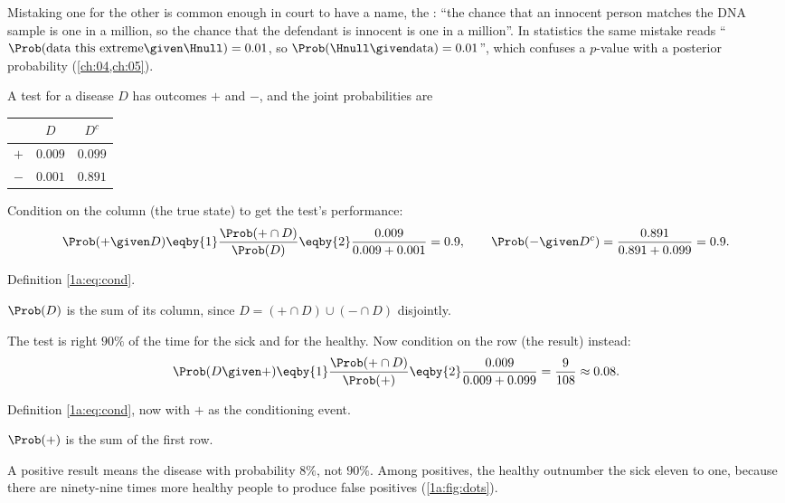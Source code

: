 Mistaking one for the other is
common enough in court to have a name, the :
``the chance that an innocent person matches the DNA sample is one in a
million, so the chance that the defendant is innocent is one in a million''.
In statistics the same mistake reads ``$\Prob(\text{data this extreme}\given\Hnull)=0.01$,
so $\Prob(\Hnull\given\text{data})=0.01$'', which confuses a $p$-value with a
posterior probability (\cref{ch:04,ch:05}).

\label{1a:ex:medical}
A test for a disease $D$ has outcomes $+$ and $-$, and the joint probabilities
are 
\begin{center}
\begin{tabular}{@{}lcc@{}}
\toprule
 & $D$ & $D^c$\\
\midrule
$+$ & $0.009$ & $0.099$\\
$-$ & $0.001$ & $0.891$\\
\bottomrule
\end{tabular}
\end{center}
Condition on the column (the true state) to get the test's performance:
\begin{align*}
\Prob(+\given D)\eqby{1}\frac{\Prob(+\cap D)}{\Prob(D)}\eqby{2}\frac{0.009}{0.009+0.001}=0.9,
\qquad
\Prob(-\given D^c)=\frac{0.891}{0.891+0.099}=0.9 .
\end{align*}
\begin{explain}
  \item Definition \eqref{1a:eq:cond}.
  \item $\Prob(D)$ is the sum of its column, since $D=(+\cap D)\cup(-\cap D)$ disjointly.
\end{explain}
The test is right $90\%$ of the time for the sick and for the healthy. Now
condition on the row (the result) instead:
\begin{align*}
\Prob(D\given +)\eqby{1}\frac{\Prob(+\cap D)}{\Prob(+)}\eqby{2}\frac{0.009}{0.009+0.099}
=\frac{9}{108}\approx0.08 .
\end{align*}
\begin{explain}
  \item Definition \eqref{1a:eq:cond}, now with $+$ as the conditioning event.
  \item $\Prob(+)$ is the sum of the first row.
\end{explain}
A positive result means the disease with probability $8\%$, not $90\%$. Among
positives, the healthy outnumber the sick eleven to one, because there are
ninety-nine times more healthy people to produce false positives
(\cref{1a:fig:dots}).

